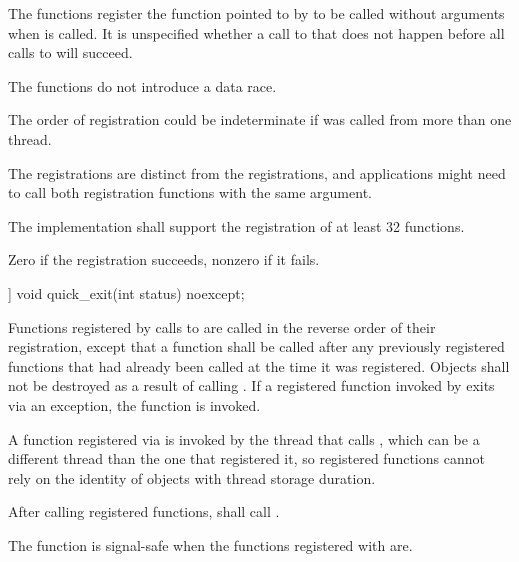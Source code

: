 \begin{itemdescr}
\pnum
\effects
The  functions register the function pointed to by 
to be called without arguments when  is called.
It is unspecified whether a call to  that does not
happen before all calls to  will succeed.
\begin{note}
The
 functions do not introduce a
data race.
\end{note}
\begin{note}
The order of registration could be indeterminate if  was called from more
than one thread.
\end{note}
\begin{note}
The
 registrations are distinct from the  registrations,
and applications might need to call both registration functions with the same argument.
\end{note}

\pnum
\implimits
The implementation shall support the registration of at least 32 functions.

\pnum
\returns
Zero if the registration succeeds, nonzero if it fails.
\end{itemdescr}

%
\begin{itemdecl}
[[noreturn]] void quick_exit(int status) noexcept;
\end{itemdecl}

\begin{itemdescr}
\pnum
\effects
Functions registered by calls to  are called in the
reverse order of their registration, except that a function shall be called after any
previously registered functions that had already been called at the time it was
registered. Objects shall not be destroyed as a result of calling .
If a registered function invoked by  exits via an exception,
the function  is invoked.%
\begin{note}
A function registered via 
is invoked by the thread that calls ,
which can be a different thread
than the one that registered it, so registered functions cannot rely on the identity
of objects with thread storage duration.
\end{note}
After calling registered functions,  shall call .

\pnum
\remarks
{}%
The function  is signal-safe
when the functions registered with  are.
\end{itemdescr}


